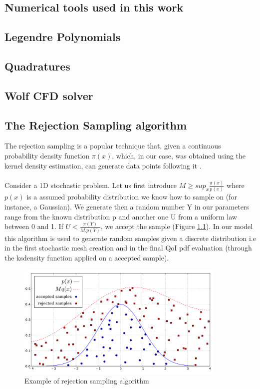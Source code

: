 \documentclass[11pt, a4paper, English]{report}
\begin{document}
\begin{appendix}
\color{blue!40!black}\chapter{Numerical tools used in this work}\color{black}
\section{Legendre Polynomials}

\section{Quadratures}

\section{Wolf CFD solver}

\section{The Rejection Sampling algorithm}
The rejection sampling is a popular technique that, given a continuous probability density function $\pi(x)$, which, in our case, was obtained using the kernel density estimation, can generate data points following it \cite{rejection}.\\\\
Consider a 1D stochastic problem.
Let us first introduce $M \ge sup_x \frac{\pi(x)}{p(x)}$ where $p(x)$ is a assumed probability distribution we know how to sample on (for instance, a Gaussian). We generate then a random number Y in our parameters range from the known distribution p and another one U from a uniform law between 0 and 1. If $ U < \frac{\pi(Y)}{M.p(Y)}$, we accept the sample (Figure \ref{rejI}). In our model this algorithm is used to generate random samples given a discrete distribution i.e in the first stochastic mesh creation and in the final QoI pdf evaluation (through the ksdensity function applied on a accepted sample).
\begin{figure}[h!]
    \centering
    \includegraphics[width=\textwidth, height = 5.5cm]{rejection-sampling.png}
    \caption{Example of rejection sampling algorithm \cite{rejImage}}
    \label{rejI}
\end{figure}

\end{appendix}
\end{document}
